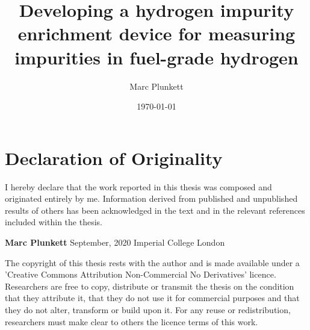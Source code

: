 \documentclass[a4paper,12pt]{report}
\begin{document}
\title{Developing a hydrogen impurity enrichment device for measuring impurities in fuel-grade hydrogen}
\author{Marc Plunkett}
\date{\today}
\maketitle

\chapter*{Declaration of Originality}
I hereby declare that the work reported in this thesis was composed and originated entirely by me. Information derived from published and unpublished results of others has been acknowledged in the text and in the relevant references included within the thesis.

\noindent\newline
\textbf{Marc Plunkett}\newline
\noindent
September, 2020
\noindent
Imperial College London\newline

The copyright of this thesis rests with the author and is made available under a 'Creative Commons Attribution Non-Commercial No Derivatives' licence. Researchers are free to copy, distribute or transmit the thesis on the condition that they attribute it, that they do not use it for commercial purposes and that they do not alter, transform or build upon it. For any reuse or redistribution, researchers must make clear to others the licence terms of this work.
\end{document}
